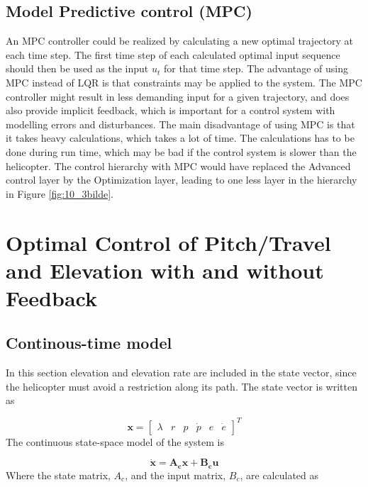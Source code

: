 \documentclass[11pt,a4paper,USenglish]{article} %
\begin{document}
\subsection{Model Predictive control (MPC)}
An MPC controller could be realized by calculating a new optimal trajectory at each time step. The first time step of each calculated optimal input sequence should then be used as the input $u_t$ for that time step. The advantage of using MPC instead of LQR is that constraints may be applied to the system. The MPC controller might result in less demanding input for a given trajectory, and does also provide implicit feedback, which is important for a control system with modelling errors and disturbances. The main disadvantage of using MPC is that it takes heavy calculations, which takes a lot of time. The calculations has to be done during run time, which may be bad if the control system is slower than the helicopter. The control hierarchy with MPC would have replaced the Advanced control layer by the Optimization layer, leading to one less layer in the hierarchy in Figure \ref{fig:10_3bilde}.

\newpage


\section{Optimal Control of Pitch/Travel and Elevation with and without Feedback}\label{sec:prob4}
\subsection{Continous-time model}
In this section elevation and elevation rate are included in the state vector, since the helicopter must avoid a restriction along its path. The state vector is written as

\begin{equation} 
	\mathbf{x} =
\begin{bmatrix}
	\lambda & r & p & \dot{p} & e & \dot{e}
\end{bmatrix}^T
\end{equation}
The continuous state-space model of the system is

\begin{equation}
    \mathbf{\dot{x}} = \mathbf{A_cx} + \mathbf{B_c}\mathbf{u}
    \label{eq:axbu2}
\end{equation}
Where the state matrix, $A_c$, and the input matrix, $B_c$, are calculated as
\end{document}
